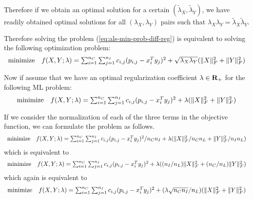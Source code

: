 Therefore if we obtain an optimal solution for a certain $(\tilde{\lambda}_X, \tilde{\lambda}_Y)$, we have readily obtained optimal solutions
for all $(\lambda_X, \lambda_Y)$ pairs such that $\lambda_X \lambda_Y = \tilde{\lambda}_X \tilde{\lambda}_Y$.

Therefore solving the problem (\ref{eq:als-min-prob-diff-reg}) is equivalent to solving the following optimization problem:
\begin{equation}
\begin{array}{ll}
\mbox{minimize} &
f(X,Y; \lambda) = \sum_{i=1}^{{n_C}} \sum_{j=1}^{{n_I}} c_{i,j} (p_{i,j} - x_i^Ty_j)^2 + \sqrt{\lambda_X \lambda_Y} (\|X\|_F^2 + \|Y\|_F^2)
\end{array}
\end{equation}


Now if assume that we have an optimal regularization coefficient $\lambda\in{\mathbf{R}_+}$ for the following ML problem:
\begin{equation}
\label{eq:nefk}
\begin{array}{ll}
\mbox{minimize} &
f(X,Y; \lambda) = \sum_{i=1}^{{n_C}} \sum_{j=1}^{{n_I}} c_{i,j} (p_{i,j} - x_i^Ty_j)^2 + \lambda (\|X\|_F^2 + \|Y\|_F^2)
\end{array}
\end{equation}

If we consider the normalization of each of the three terms in the objective function,
we can formulate the problem as follows.
\begin{equation}
\begin{array}{ll}
\mbox{minimize} &
f(X,Y; \lambda) = \sum_{i=1}^{{n_C}} \sum_{j=1}^{{n_I}} c_{i,j} (p_{i,j} - x_i^Ty_j)^2 / {{n_C}{n_I}}
+ \lambda (\|X\|_F^2/{{n_C}{n_L}} + \|Y\|_F^2/{{n_I} {n_L}})
\end{array}
\end{equation}
which is equivalent to
\begin{equation}
\begin{array}{ll}
\mbox{minimize} &
f(X,Y; \lambda) = \sum_{i=1}^{{n_C}} \sum_{j=1}^{{n_I}} c_{i,j} (p_{i,j} - x_i^Ty_j)^2
+ \lambda (({n_I}/{n_L})\|X\|_F^2 + ({n_C} / {n_L}) \|Y\|_F^2)
\end{array}
\end{equation}
which again is equivalent to
\begin{equation}
\label{eq:buysjh}
\begin{array}{ll}
\mbox{minimize} &
f(X,Y; \lambda) = \sum_{i=1}^{{n_C}} \sum_{j=1}^{{n_I}} c_{i,j} (p_{i,j} - x_i^Ty_j)^2
+ (\lambda \sqrt{{n_C} {n_I}} / {n_L}) ( \|X\|_F^2 + \|Y\|_F^2)
\end{array}
\end{equation}



